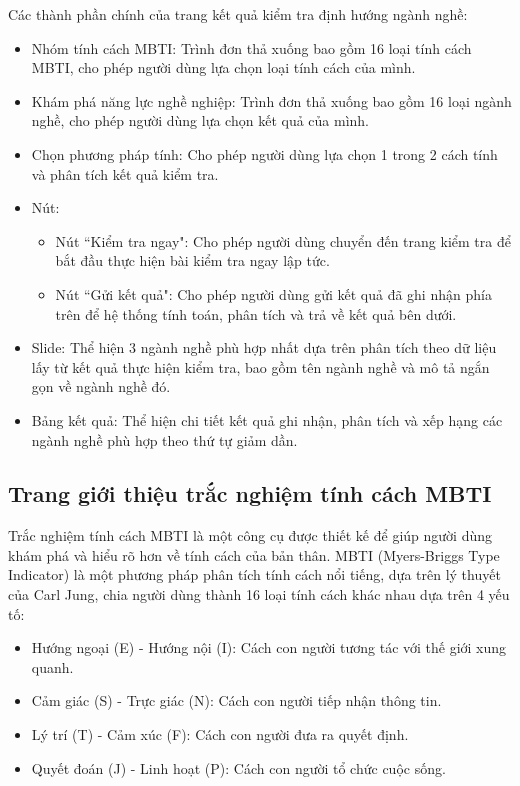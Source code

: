 Các thành phần chính của trang kết quả kiểm tra định hướng ngành nghề:
\begin{itemize}
    \item Nhóm tính cách MBTI: Trình đơn thả xuống bao gồm 16 loại tính cách MBTI, cho phép người dùng lựa chọn loại tính cách của mình.
    \item Khám phá năng lực nghề nghiệp: Trình đơn thả xuống bao gồm 16 loại ngành nghề, cho phép người dùng lựa chọn kết quả của mình.
    \item Chọn phương pháp tính: Cho phép người dùng lựa chọn 1 trong 2 cách tính và phân tích kết quả kiểm tra.
    \item Nút:
        \begin{itemize}
            \item Nút ``Kiểm tra ngay": Cho phép người dùng chuyển đến trang kiểm tra để bắt đầu thực hiện bài kiểm tra ngay lập tức.
            \item Nút ``Gửi kết quả": Cho phép người dùng gửi kết quả đã ghi nhận phía trên để hệ thống tính toán, phân tích và trả về kết quả bên dưới.
        \end{itemize}
    \item Slide: Thể hiện 3 ngành nghề phù hợp nhất dựa trên phân tích theo dữ liệu lấy từ kết quả thực hiện kiểm tra, bao gồm tên ngành nghề và mô tả ngắn gọn về ngành nghề đó.
    \item Bảng kết quả: Thể hiện chi tiết kết quả ghi nhận, phân tích và xếp hạng các ngành nghề phù hợp theo thứ tự giảm dần.
\end{itemize}


\subsection{Trang giới thiệu trắc nghiệm tính cách MBTI}
Trắc nghiệm tính cách MBTI là một công cụ được thiết kế để giúp người dùng khám phá và hiểu rõ hơn về tính cách của bản thân. MBTI (Myers-Briggs Type Indicator) là một phương pháp phân tích tính cách nổi tiếng, dựa trên lý thuyết của Carl Jung, chia người dùng thành 16 loại tính cách khác nhau dựa trên 4 yếu tố:
\begin{itemize}
    \item Hướng ngoại (E) - Hướng nội (I): Cách con người tương tác với thế giới xung quanh.
    \item Cảm giác (S) - Trực giác (N): Cách con người tiếp nhận thông tin.
    \item Lý trí (T) - Cảm xúc (F): Cách con người đưa ra quyết định.
    \item Quyết đoán (J) - Linh hoạt (P): Cách con người tổ chức cuộc sống.
\end{itemize}

